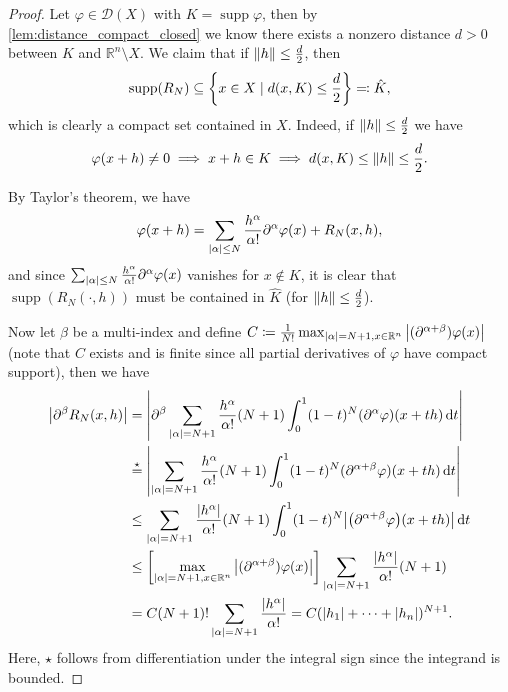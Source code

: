 \documentclass{article}
\theoremstyle{plain}
\theoremstyle{remark}
\renewcommand{\phi}{\varphi}
\newcommand{\Bb}{\mathbb}
\newcommand{\Cal}{\mathcal}
\newcommand{\NN}{\Bb N}
\newcommand{\RR}{\Bb R}
\newcommand{\DD}{\Cal D}
\newcommand\ceq\coloneqq %
\newcommand\pt\partial
\DeclareMathOperator{\supp}{supp}
\newcommand\clos\overline
\begin{document}
\begin{proof}
	Let $\phi \in \DD(X)$ with $K = \supp\phi$, then by \cref{lem:distance_compact_closed} we know there exists a nonzero distance $d > 0$ between $K$ and $\RR^n \setminus X$. 
	We claim that if $\norm{h} \leq \frac d2$, then 
	\[
	\supp(R_N) \subseteq \qty{x \in X \mid d(x, K) \leq \frac d2} \eqqcolon \hat K,
	\]
	which is clearly a compact set contained in $X$. Indeed, if $\norm{h} \leq \frac d2$ we have
	\[
	\phi(x+h) \neq 0 \implies x + h \in K \implies d(x, K) \leq \norm{h} \leq \frac d2. 
	\]
	
	
%	
	By Taylor's theorem, we have
	\[
	\phi(x+h) = \sum_{\abs{\alpha} \leq N} \frac{h^\alpha}{\alpha!} \pt^\alpha \phi(x) + R_N(x, h),  
	\]
	and since $\sum_{\abs{\alpha} \leq N} \frac{h^\alpha}{\alpha!} \pt^\alpha \phi(x)$ vanishes for $x \notin K$, it is clear that $\supp(R_N(\cdot, h))$ must be contained in $\hat K$ (for $\norm{h} \leq \frac d2$). 
	
	Now let $\beta$ be a multi-index and define $C \ceq \frac{1}{N!} \max_{\abs{\alpha} = N+1, x \in \RR^n} \abs{(\pt^{\alpha + \beta})\phi(x)}$ (note that $C$ exists and is finite since all partial derivatives of $\phi$ have compact support), then we have
	\begin{align*}
	\abs{\pt^\beta R_N(x, h)} &= \abs{\pt^\beta \sum_{\abs{\alpha} = N+1} \frac{h^\alpha}{\alpha!}(N+1)\int_0^1 (1-t)^N (\pt^\alpha\phi)(x + th)\dd{t}} \\
	&\overset\star= \abs{\sum_{\abs{\alpha} = N+1} \frac{h^\alpha}{\alpha!}(N+1) \int_0^1 (1-t)^N (\pt^{\alpha + \beta}\phi)(x + th)\dd{t}} \\
	&\leq \sum_{\abs{\alpha} = N+1} \frac{\abs{h^\alpha}}{\alpha!}(N+1) \int_0^1 (1-t)^N \abs{\qty(\pt^{\alpha + \beta}\phi)(x+th)} \dd{t} \\
	&\leq \qty[\max_{\abs{\alpha} = N+1, x \in \RR^n} \abs{(\pt^{\alpha + \beta})\phi(x)}] \sum_{\abs{\alpha} = N+1} \frac{\abs{h^\alpha}}{\alpha!} (N+1) \\
	&= C (N+1)! \sum_{\abs{\alpha}= N+1}\frac{\abs{h^\alpha}}{\alpha!} = C(\abs{h_1} + \dotsb + \abs{h_n})^{N+1}.
\end{align*}
Here, $\star$ follows from differentiation under the integral sign since the integrand is bounded. 


\end{proof}
\end{document}
